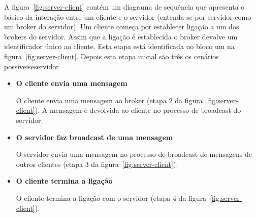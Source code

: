 A figura~\ref{fig:server-client} contém um diagrama de sequência que apresenta o básico da interação entre um cliente e o servidor (entenda-se por servidor como um broker do servidor).
Um cliente começa por establecer ligação a um dos brokers do servidor. Assim que a ligação é establecida o broker devolve um identificador único ao cliente. Esta etapa está identificada no bloco um na figura~\ref{fig:server-client}. Depois esta etapa inicial são três os cenários possíveiseservidor

\begin{itemize}
\item
\textbf{O cliente envia uma mensagem}

O cliente envia uma mensagem ao broker (etapa 2 da figura~\ref{fig:server-client}). A mensagem é devolvida ao cliente no processo de broadcast do servidor.

\item
\textbf{O servidor faz broadcast de uma mensagem}

O servidor envia uma mensagem no processo de broadcast de mensagens de outros clientes (etapa 3 da figura~\ref{fig:server-client}).

\item
\textbf{O cliente termina a ligação}

O cliente termina a ligação com o servidor (etapa 4 da figura~\ref{fig:server-client}).
\end{itemize}
